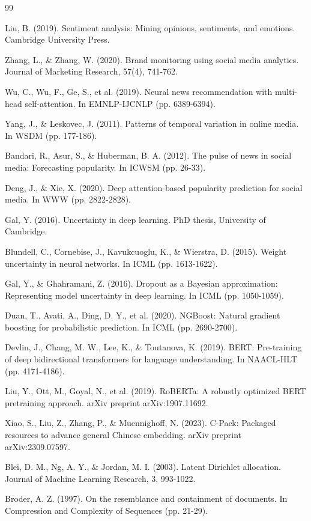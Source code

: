 \documentclass[10pt]{article}
\begin{document}

\begin{thebibliography}{99}

Liu, B. (2019). Sentiment analysis: Mining opinions, sentiments, and emotions. Cambridge University Press.

Zhang, L., \& Zhang, W. (2020). Brand monitoring using social media analytics. Journal of Marketing Research, 57(4), 741-762.

Wu, C., Wu, F., Ge, S., et al. (2019). Neural news recommendation with multi-head self-attention. In EMNLP-IJCNLP (pp. 6389-6394).

Yang, J., \& Leskovec, J. (2011). Patterns of temporal variation in online media. In WSDM (pp. 177-186).

Bandari, R., Asur, S., \& Huberman, B. A. (2012). The pulse of news in social media: Forecasting popularity. In ICWSM (pp. 26-33).

Deng, J., \& Xie, X. (2020). Deep attention-based popularity prediction for social media. In WWW (pp. 2822-2828).

Gal, Y. (2016). Uncertainty in deep learning. PhD thesis, University of Cambridge.

Blundell, C., Cornebise, J., Kavukcuoglu, K., \& Wierstra, D. (2015). Weight uncertainty in neural networks. In ICML (pp. 1613-1622).

Gal, Y., \& Ghahramani, Z. (2016). Dropout as a Bayesian approximation: Representing model uncertainty in deep learning. In ICML (pp. 1050-1059).

Duan, T., Avati, A., Ding, D. Y., et al. (2020). NGBoost: Natural gradient boosting for probabilistic prediction. In ICML (pp. 2690-2700).

Devlin, J., Chang, M. W., Lee, K., \& Toutanova, K. (2019). BERT: Pre-training of deep bidirectional transformers for language understanding. In NAACL-HLT (pp. 4171-4186).

Liu, Y., Ott, M., Goyal, N., et al. (2019). RoBERTa: A robustly optimized BERT pretraining approach. arXiv preprint arXiv:1907.11692.

Xiao, S., Liu, Z., Zhang, P., \& Muennighoff, N. (2023). C-Pack: Packaged resources to advance general Chinese embedding. arXiv preprint arXiv:2309.07597.

Blei, D. M., Ng, A. Y., \& Jordan, M. I. (2003). Latent Dirichlet allocation. Journal of Machine Learning Research, 3, 993-1022.

Broder, A. Z. (1997). On the resemblance and containment of documents. In Compression and Complexity of Sequences (pp. 21-29).

\end{thebibliography}
\end{document}
